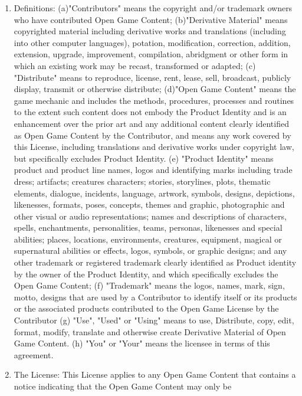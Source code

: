 \documentclass[
]{article}
\begin{document}
\begin{enumerate}
\def\labelenumi{\arabic{enumi}.}
\item
  Definitions: (a)"Contributors" means the copyright and/or trademark
  owners who have contributed Open Game Content; (b)"Derivative
  Material" means copyrighted material including derivative works and
  translations (including into other computer languages), potation,
  modification, correction, addition, extension, upgrade, improvement,
  compilation, abridgment or other form in which an existing work may be
  recast, transformed or adapted; (c) "Distribute" means to reproduce,
  license, rent, lease, sell, broadcast, publicly display, transmit or
  otherwise distribute; (d)"Open Game Content" means the game mechanic
  and includes the methods, procedures, processes and routines to the
  extent such content does not embody the Product Identity and is an
  enhancement over the prior art and any additional content clearly
  identified as Open Game Content by the Contributor, and means any work
  covered by this License, including translations and derivative works
  under copyright law, but specifically excludes Product Identity. (e)
  "Product Identity" means product and product line names, logos and
  identifying marks including trade dress; artifacts; creatures
  characters; stories, storylines, plots, thematic elements, dialogue,
  incidents, language, artwork, symbols, designs, depictions,
  likenesses, formats, poses, concepts, themes and graphic, photographic
  and other visual or audio representations; names and descriptions of
  characters, spells, enchantments, personalities, teams, personas,
  likenesses and special abilities; places, locations, environments,
  creatures, equipment, magical or supernatural abilities or effects,
  logos, symbols, or graphic designs; and any other trademark or
  registered trademark clearly identified as Product identity by the
  owner of the Product Identity, and which specifically excludes the
  Open Game Content; (f) "Trademark" means the logos, names, mark, sign,
  motto, designs that are used by a Contributor to identify itself or
  its products or the associated products contributed to the Open Game
  License by the Contributor (g) "Use", "Used" or "Using" means to use,
  Distribute, copy, edit, format, modify, translate and otherwise create
  Derivative Material of Open Game Content. (h) "You" or "Your" means
  the licensee in terms of this agreement.
\item
  The License: This License applies to any Open Game Content that
  contains a notice indicating that the Open Game Content may only be

\end{enumerate}
\end{document}
